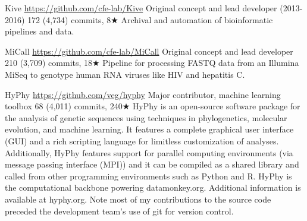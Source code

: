 {Kive}
{\url{https://github.com/cfe-lab/Kive}}
{Original concept and lead developer (2013-2016)}
{172 (4,734) commits, 8$\bigstar$}
{Archival and automation of bioinformatic pipelines and data.}


{MiCall}
{\url{https://github.com/cfe-lab/MiCall}}
{Original concept and lead developer}
{210 (3,709) commits, 18$\bigstar$}
{Pipeline for processing FASTQ data from an Illumina MiSeq to genotype human RNA viruses like HIV and hepatitis C.}


{HyPhy}
{\url{https://github.com/veg/hyphy}}
{Major contributor, machine learning toolbox}
{68 (4,011) commits, 240$\bigstar$}
{
HyPhy is an open-source software package for the analysis of genetic sequences using techniques in phylogenetics, molecular evolution, and machine learning. 
It features a complete graphical user interface (GUI) and a rich scripting language for limitless customization of analyses. 
Additionally, HyPhy features support for parallel computing environments (via message passing interface (MPI)) and it can be compiled as a shared library and called from other programming environments such as Python and R. 
HyPhy is the computational backbone powering datamonkey.org. Additional information is available at hyphy.org.
Note most of my contributions to the source code preceded the development team's use of git for version control.
}



